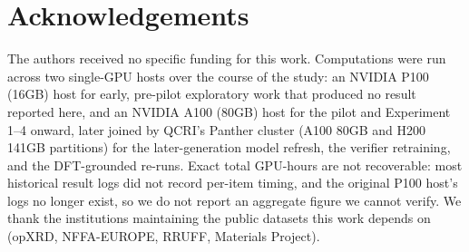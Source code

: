 \documentclass[pdflatex,sn-nature]{sn-jnl}
\begin{document}
\section*{Acknowledgements}
The authors received no specific funding for this work.
Computations were run across two single-GPU hosts over the course of the study: an NVIDIA P100 (16GB) host for early, pre-pilot exploratory work that produced no result reported here, and an NVIDIA A100 (80GB) host for the pilot and Experiment 1--4 onward, later joined by QCRI's Panther cluster (A100 80GB and H200 141GB partitions) for the later-generation model refresh, the verifier retraining, and the DFT-grounded re-runs. Exact total GPU-hours are not recoverable: most historical result logs did not record per-item timing, and the original P100 host's logs no longer exist, so we do not report an aggregate figure we cannot verify. We thank the institutions maintaining the public datasets this work depends on (opXRD, NFFA-EUROPE, RRUFF, Materials Project).


\end{document}
